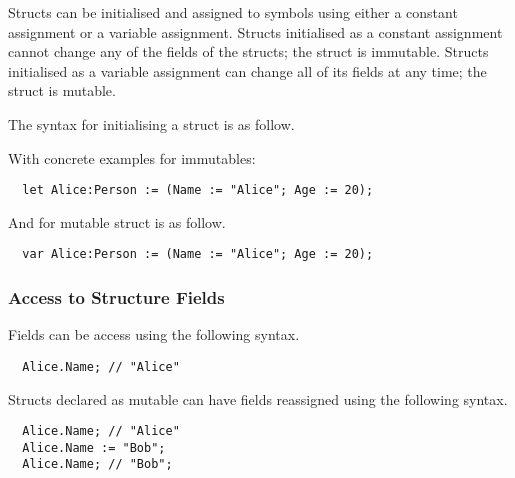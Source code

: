 Structs can be initialised and assigned to symbols using either a constant assignment or a variable assignment. Structs initialised as a constant assignment cannot change any of the fields of the structs; the struct is immutable. Structs initialised as a variable assignment can change all of its fields at any time; the struct is mutable.

The syntax for initialising a struct is as follow.


With concrete examples for immutables:

\begin{verbatim}
  let Alice:Person := (Name := "Alice"; Age := 20);
\end{verbatim}

And for mutable struct is as follow.

\begin{verbatim}
  var Alice:Person := (Name := "Alice"; Age := 20);
\end{verbatim}

\subsubsection{Access to Structure Fields}
\label{sec:accessStructFields}

Fields can be access using the following syntax.

\begin{verbatim}
  Alice.Name; // "Alice"
\end{verbatim}

Structs declared as mutable can have fields reassigned using the following syntax.

\begin{verbatim}
  Alice.Name; // "Alice"
  Alice.Name := "Bob";
  Alice.Name; // "Bob";
\end{verbatim}
